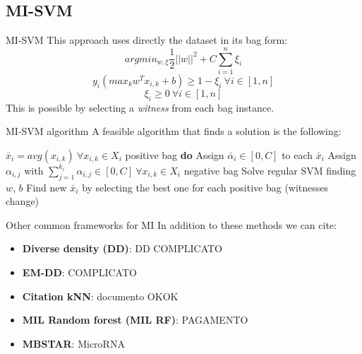 \subsection{MI-SVM}
\begin{frame}{MI-SVM}
	This approach uses directly the dataset in its bag form:
	$$arg min_{w, \xi} \frac{1}{2} ||w||^2 + C \sum_{i = 1}^{n}\xi_i$$
	$$y_i (max_k w^T x_{i,k} + b) \geq 1 - \xi_i \ \forall i \in [1, n]$$
	$$\xi_i \geq 0 \ \forall i \in [1, n]$$
	This is possible by selecting a \textit{witness} from each bag instance.
\end{frame}

\begin{frame}{MI-SVM algorithm}
	A feasible algorithm that finds a solution is the following:
	
	\begin{codebox}
		\li $\bar{x}_i = avg(x_{i,k}) \ \forall x_{i,k} \in X_i$ positive bag
		\li \textbf{do} \Do
		\li Assign $\bar{\alpha}_i \in [0,C]$ to each $\bar{x}_i$
		\li Assign $\alpha_{i,j}$ with $\sum_{j=1}^{k_i}\alpha_{i,j} \in [0,C] \ \forall x_{i,k} \in X_i$ negative bag
		\li Solve regular SVM finding $w$, $b$
		\li Find new $\bar{x}_i$ by selecting the best one for each positive bag \End
		\li \While(witnesses change)
		
	\end{codebox}
	
\end{frame}

\begin{frame}{Other common frameworks for MI}
	In addition to these methods we can cite:
	\begin{itemize}
		\item \textbf{Diverse density (DD)}: DD COMPLICATO
		\item \textbf{EM-DD}: COMPLICATO
		\item \textbf{Citation kNN}: documento OKOK
		\item \textbf{MIL Random forest (MIL RF)}: PAGAMENTO
		\item \textbf{MBSTAR}: MicroRNA
	\end{itemize}
\end{frame}

